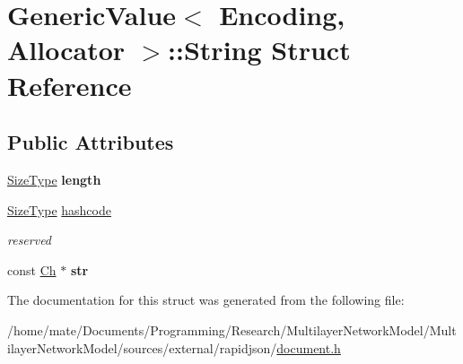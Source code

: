 \hypertarget{structGenericValue_1_1String}{}\section{Generic\+Value$<$ Encoding, Allocator $>$\+:\+:String Struct Reference}
\label{structGenericValue_1_1String}
\subsection*{Public Attributes}
\begin{DoxyCompactItemize}
\item 
\hyperlink{rapidjson_8h_a5ed6e6e67250fadbd041127e6386dcb5}{Size\+Type} {\bfseries length}\hypertarget{structGenericValue_1_1String_ad6ffab0e093aa8db6e415812ff6443bf}{}\label{structGenericValue_1_1String_ad6ffab0e093aa8db6e415812ff6443bf}

\item 
\hyperlink{rapidjson_8h_a5ed6e6e67250fadbd041127e6386dcb5}{Size\+Type} \hyperlink{structGenericValue_1_1String_a73631052aeb72fbabb6eaab0175f858e}{hashcode}\hypertarget{structGenericValue_1_1String_a73631052aeb72fbabb6eaab0175f858e}{}\label{structGenericValue_1_1String_a73631052aeb72fbabb6eaab0175f858e}

\begin{DoxyCompactList}\small\item\em reserved \end{DoxyCompactList}\item 
const \hyperlink{classGenericValue_ade0e0ce64ccd5d852da57a35e720bafb}{Ch} $\ast$ {\bfseries str}\hypertarget{structGenericValue_1_1String_a4eebc5acf3f93ab833efd82abf3ba84d}{}\label{structGenericValue_1_1String_a4eebc5acf3f93ab833efd82abf3ba84d}

\end{DoxyCompactItemize}


The documentation for this struct was generated from the following file\+:\begin{DoxyCompactItemize}
\item 
/home/mate/\+Documents/\+Programming/\+Research/\+Multilayer\+Network\+Model/\+Multilayer\+Network\+Model/sources/external/rapidjson/\hyperlink{document_8h}{document.\+h}\end{DoxyCompactItemize}

